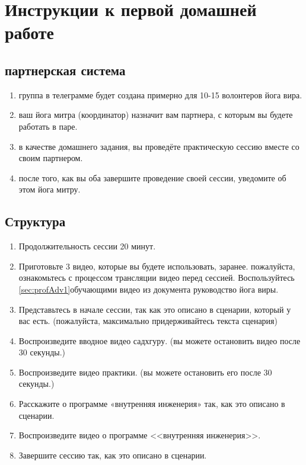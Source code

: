 \section*{Инструкции к первой домашней работе}
\label{sec:homework}

\subsection*{партнерская система}
\begin{enumerate}
\item группа в телеграмме будет создана примерно для 10-15 волонтеров йога вира.
\item ваш йога митра (координатор) назначит вам партнера, с которым вы будете работать в
паре.
\item в качестве домашнего задания, вы проведёте практическую сессию вместе со своим
партнером.
\item после того, как вы оба завершите проведение своей сессии, уведомите об этом йога митру.
\end{enumerate}

\subsection*{Структура}
\begin{enumerate}
\item Продолжительность сессии 20 минут.
\item Приготовьте 3 видео, которые вы будете использовать, заранее. пожалуйста, ознакомьтесь с процессом трансляции видео перед сессией. Воспользуйтесь \ref{sec:profAdv1}{обучающими видео} из документа руководство йога виры.
\item Представьтесь в начале сессии, так как это описано в сценарии, который у вас есть.
(пожалуйста, максимально придерживайтесь текста сценария)
\item Воспроизведите вводное видео садхгуру. (вы можете остановить видео после 30
секунды.)
\item Воспроизведите видео практики. (вы можете остановить его после 30 секунды.)
\item Расскажите о программе «внутренняя инженерия» так, как это описано в сценарии.
\item Воспроизведите видео о программе <<внутренняя инженерия>>.
\item Завершите сессию так, как это описано в сценарии.
\end{enumerate}


